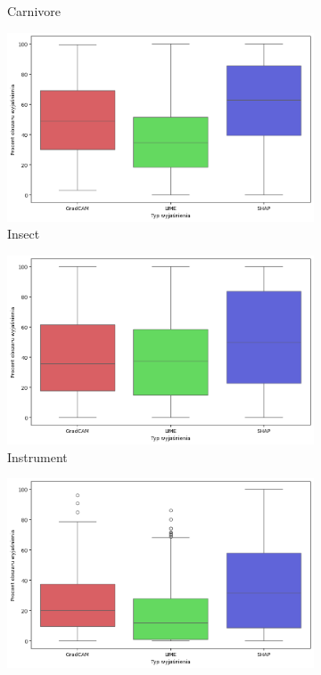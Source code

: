 \begin{figure}[h]
\begin{subfigure}[b]{0.3\textwidth}
		\caption{Carnivore}
	\end{subfigure}
	\begin{subfigure}[b]{0.3\textwidth}
		\centering\includegraphics[width=.9\textwidth]{img/areaincorrect_insect}
		\caption{Insect}
	\end{subfigure}
	\begin{subfigure}[b]{0.3\textwidth}
		\centering\includegraphics[width=.9\textwidth]{img/areaincorrect_music}
		\caption{Instrument}
	\end{subfigure}
	\begin{subfigure}[b]{0.3\textwidth}
		\centering\includegraphics[width=.9\textwidth]{img/areaincorrect_primate}

\end{subfigure}
\end{figure}
